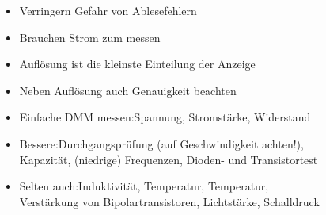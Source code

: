 \begin{frame}
\begin{columns}
\begin{center}
\begin{figure}
      \end{figure}
    \end{center}
    \begin{itemize}
      \item Verringern Gefahr von Ablesefehlern
      \item Brauchen Strom zum messen
      \item Auflösung ist die kleinste Einteilung der Anzeige
      \item Neben Auflösung auch Genauigkeit beachten
      \item Einfache DMM messen:\newline Spannung, Stromstärke, Widerstand
      \item Bessere:\newline Durchgangsprüfung (auf Geschwindigkeit achten!), Kapazität, (niedrige) Frequenzen, Dioden- und Transistortest
      \item Selten auch:\newline Induktivität, Temperatur, Temperatur, Verstärkung von Bipolartransistoren, Lichtstärke, Schalldruck
    \end{itemize}
  \end{columns}
\end{frame}

